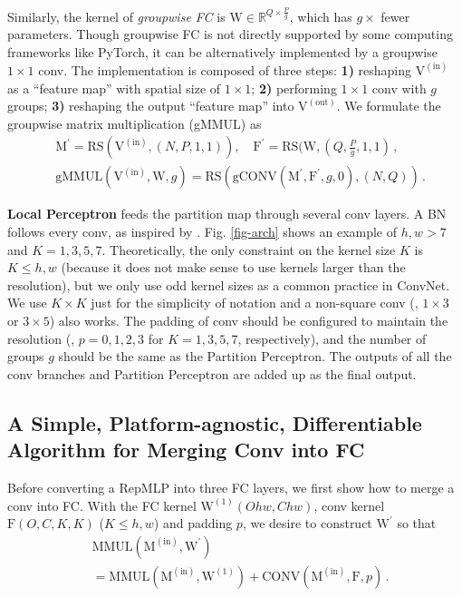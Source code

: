 \documentclass[10pt,twocolumn,letterpaper]{article}
\begin{document}
Similarly, the kernel of \textit{groupwise FC} is $\mathrm{W}\in\mathbb{R}^{Q\times \frac{P}{g}}$, which has $g\times$ fewer parameters. Though groupwise FC is not directly supported by some computing frameworks like PyTorch, it can be alternatively implemented by a groupwise $1\times1$ conv. The implementation is composed of three steps: \textbf{1)} reshaping $\mathrm{V}^{(\text{in})}$ as a ``feature map'' with spatial size of $1\times1$; \textbf{2)} performing $1\times1$ conv with $g$ groups; \textbf{3)} reshaping the output ``feature map'' into $\mathrm{V}^{(\text{out})}$. We formulate the groupwise matrix multiplication (gMMUL) as
\begin{equation}
\begin{aligned}
&\mathrm{M}^\prime=\text{RS}(\mathrm{V}^{(\text{in})}, (N, P, 1, 1)),\quad \mathrm{F}^\prime=\text{RS}(\mathrm{W}, (Q, \frac{P}{g}, 1, 1) \,, \\
&\text{gMMUL}(\mathrm{V}^{(\text{in})}, \mathrm{W}, g) = \text{RS}(\text{gCONV}(\mathrm{M}^\prime, \mathrm{F}^\prime, g, 0), (N, Q)) \,.
\end{aligned}
\end{equation}


\textbf{Local Perceptron} feeds the partition map through several conv layers. A BN follows every conv, as inspired by \cite{ding2019acnet,ding2021repvgg}. Fig. \ref{fig-arch} shows an example of $h,w>7$ and $K=1,3,5,7$. Theoretically, the only constraint on the kernel size $K$ is $K\leq h,w$ (because it does not make sense to use kernels larger than the resolution), but we only use odd kernel sizes as a common practice in ConvNet. We use $K\times K$ just for the simplicity of notation and a non-square conv (\eg, $1\times3$ or $3\times5$) also works. The padding of conv should be configured to maintain the resolution (\eg, $p=0,1,2,3$ for $K=1,3,5,7$, respectively), and the number of groups $g$ should be the same as the Partition Perceptron. The outputs of all the conv branches and Partition Perceptron are added up as the final output.


\subsection{A Simple, Platform-agnostic, Differentiable Algorithm for Merging Conv into FC}
Before converting a RepMLP into three FC layers, we first show how to merge a conv into FC. With the FC kernel $\mathrm{W}^{(1)}(Ohw,Chw)$, conv kernel $\mathrm{F}(O,C,K,K)$ ($K\leq h,w$) and padding $p$, we desire to construct $\mathrm{W}^\prime$ so that
\begin{equation}
\begin{aligned}
&\text{MMUL}(\mathrm{M}^{(\text{in})},\mathrm{W}^\prime) \\
&=\text{MMUL}(\mathrm{M}^{(\text{in})},\mathrm{W}^{(1)}) + \text{CONV}(\mathrm{M}^{(\text{in})},\mathrm{F},p) \,.
\end{aligned}
\end{equation}
\end{document}
